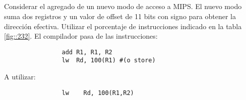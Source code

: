 \subsection{}
        
            Considerar el agregado de un nuevo modo de acceso a MIPS.
            El nuevo modo suma dos registros y un valor de offset de 11 bits con signo para obtener
            la dirección efectiva. Utilizar el porcentaje de instrucciones indicado en la tabla \ref{fig::232}.
            \vspace{3mm}
            El compilador pasa de las instrucciones: 
            \begin{verbatim}
                add R1, R1, R2
                lw  Rd, 100(R1) #(o store)
            \end{verbatim}
            \vspace{1.5mm}
            A utilizar:
            \begin{verbatim}
                lw    Rd, 100(R1,R2)
            \end{verbatim}
            
